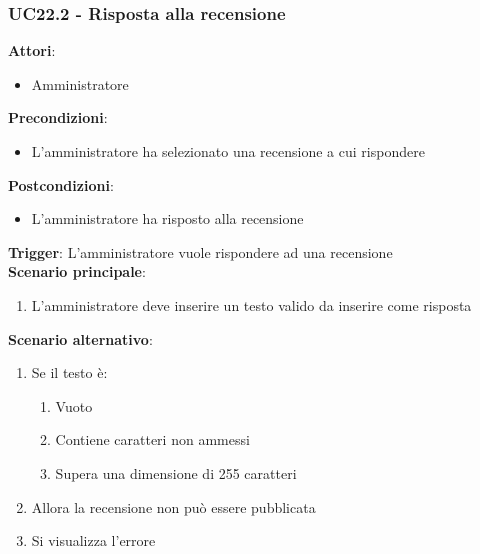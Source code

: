 \subsubsection{UC22.2 - Risposta alla recensione}\label{usecase:22_2}
\textbf{Attori}:
\begin{itemize}
    \item Amministratore
\end{itemize}
\textbf{Precondizioni}:
\begin{itemize}
    \item L'amministratore ha selezionato una recensione a cui rispondere
\end{itemize}
\textbf{Postcondizioni}:
\begin{itemize}
    \item L'amministratore ha risposto alla recensione
\end{itemize}
\textbf{Trigger}:
L'amministratore vuole rispondere ad una recensione\\
\textbf{Scenario principale}:
\begin{enumerate}
    \item L'amministratore deve inserire un testo valido da inserire come risposta
\end{enumerate}
\textbf{Scenario alternativo}:
\begin{enumerate}
    \item Se il testo è: 
    \begin{enumerate}
        \item Vuoto
        \item Contiene caratteri non ammessi
        \item Supera una dimensione di 255 caratteri
    \end{enumerate}
    \item Allora la recensione non può essere pubblicata
    \item Si visualizza l'errore
\end{enumerate}
